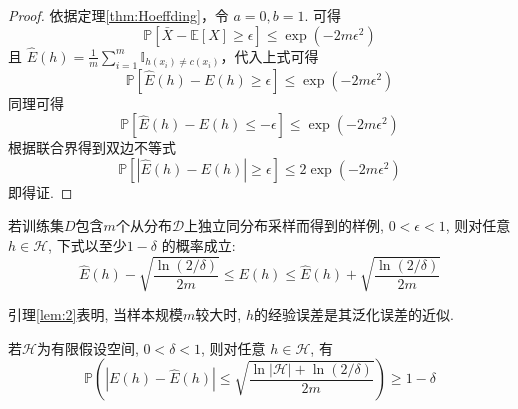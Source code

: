 \begin{proof}
依据定理\ref{thm:Hoeffding}，令 $a=0,b=1$. 可得
\begin{equation}
\mathbb{P}\left[ \bar{X}-\mathbb{E}\left[ X \right] \ge \epsilon \right] \le \exp \left( -2m\epsilon ^2 \right)
\end{equation}
且 $\hat{E}\left( h \right) =\frac{1}{m}\sum_{i=1}^m{\mathbb{I}_{h\left( x_i \right) \ne c\left( x_i \right)}}$，代入上式可得
\begin{equation}
\mathbb{P}\left[ \hat{E}\left( h \right) -E\left( h \right) \ge \epsilon \right] \le \exp \left( -2m\epsilon ^2 \right) \nonumber
\end{equation}
同理可得
\begin{equation}
\mathbb{P}\left[ \hat{E}\left( h \right) -E\left( h \right) \le -\epsilon \right] \le \exp \left( -2m\epsilon ^2 \right) \nonumber
\end{equation}
根据联合界得到双边不等式
\begin{equation}
\mathbb{P}\left[ \left| \hat{E}\left( h \right) -E\left( h \right) \right|\ge \epsilon \right] \le 2\exp \left( -2m\epsilon ^2 \right) \nonumber
\end{equation}
即得证. 
\end{proof}


\begin{lemma}\label{lem:2}
若训练集$D$包含$m$个从分布$\mathcal{D}$上独立同分布采样而得到的样例, $0<\epsilon<1$, 则对任意$h\in \mathcal{H}$, 下式以至少$1-\delta$ 的概率成立:
\begin{equation}
\hat{E}\left( h \right)-\sqrt{\frac{\ln \left( 2/\delta \right)}{2m}}\le E(h)\le \hat{E}\left( h \right)+\sqrt{\frac{\ln \left( 2/\delta \right)}{2m}}
\end{equation}
\end{lemma}


引理\ref{lem:2}表明, 当样本规模$m$较大时, $h$的经验误差是其泛化误差的近似. 


\begin{theorem}\label{thm:2}
若$\mathcal{H}$为有限假设空间, $0<\delta<1$, 则对任意 $h\in \mathcal{H}$, 有
\begin{equation}
\mathbb{P}(|E(h)-\hat{E}(h)|\le\sqrt{\frac{\ln \left| \mathcal{H} \right|+\ln \left( 2/\delta \right)}{2m}})\ge 1-\delta
\end{equation}
\end{theorem}


